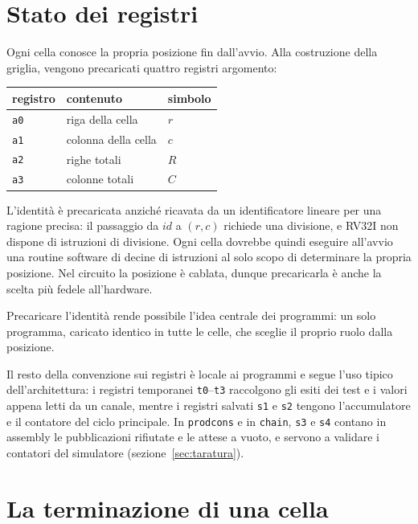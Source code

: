 \section{Stato dei registri}
\label{sec:registri}

Ogni cella conosce la propria posizione fin dall'avvio. Alla costruzione della
griglia, vengono precaricati quattro registri argomento:

\begin{center}
\begin{tabular}{lll}
    \toprule
    registro & contenuto & simbolo \\
    \midrule
    \texttt{a0} & riga della cella & $r$ \\
    \texttt{a1} & colonna della cella & $c$ \\
    \texttt{a2} & righe totali & $R$ \\
    \texttt{a3} & colonne totali & $C$ \\
    \bottomrule
\end{tabular}
\end{center}

L'identità è precaricata anziché ricavata da un identificatore lineare per una
ragione precisa: il passaggio da $\mathit{id}$ a $(r,c)$ richiede una
divisione, e RV32I non dispone di istruzioni di divisione. Ogni cella
dovrebbe quindi eseguire all'avvio una routine software di decine di istruzioni
al solo scopo di determinare la propria posizione. Nel circuito la
posizione è cablata, dunque precaricarla è anche la scelta più fedele all'hardware.

Precaricare l'identità rende possibile l'idea centrale dei programmi: un solo
programma, caricato identico in tutte le celle, che sceglie il proprio ruolo
dalla posizione.

Il resto della convenzione sui registri è locale ai programmi e segue l'uso
tipico dell'architettura: i registri temporanei \texttt{t0}--\texttt{t3}
raccolgono gli esiti dei test e i valori appena letti da un canale, mentre i
registri salvati \texttt{s1} e \texttt{s2} tengono l'accumulatore e il contatore
del ciclo principale. In
\texttt{prodcons} e in \texttt{chain}, \texttt{s3} e \texttt{s4} contano in
assembly le pubblicazioni rifiutate e le attese a vuoto, e servono a validare i
contatori del simulatore (sezione~\ref{sec:taratura}).

\section{La terminazione di una cella}
\label{sec:ecall}

